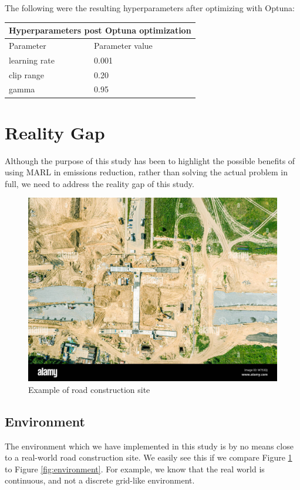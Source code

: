 \documentclass[conference]{IEEEtran}
\begin{document}
	The following were the resulting hyperparameters after optimizing with Optuna:
	\begin{tabular}{ |p{}||p{}|  }
		\hline
		\multicolumn{2}{|c|}{Hyperparameters post Optuna optimization} \\
		\hline
		\hline
		Parameter         & Parameter value\\
		\hline
		learning rate     & 0.001\\
		\hline
		clip range        & 0.20\\
		\hline
		gamma             & 0.95\\
		\hline
	\end{tabular}


	\section{Reality Gap}
	Although the purpose of this study has been to highlight the possible benefits of using MARL in
	emissions reduction, rather than solving the actual problem in full, we need to address the reality
	gap of this study.

  \begin{figure}[!ht]
		\includegraphics[width=\columnwidth]{graphs/road-construction-site-example.jpeg}
		\caption{Example of road construction site}
		\label{fig:construction-site}
	\end{figure}

	\subsection{Environment}
	The environment which we have implemented in this study is by no means close to a
	real-world road construction site. We easily see this if we compare Figure \ref{fig:construction-site}
	to Figure \ref{fig:environment}. For example, we know that the real world is continuous, and not a discrete
	grid-like environment.
\end{document}
